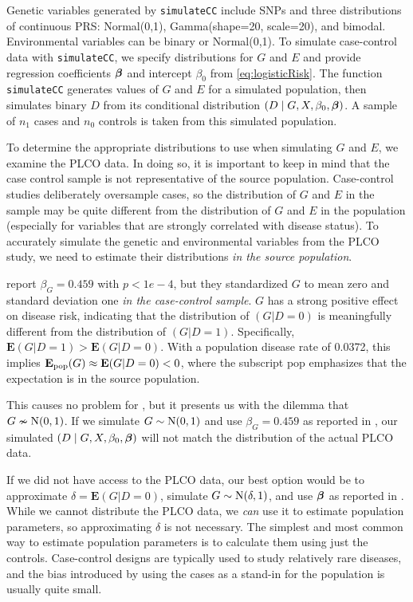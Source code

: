 \documentclass[]{article}
\begin{document}
Genetic variables generated by \texttt{simulateCC} include SNPs and
three distributions of continuous PRS: Normal(0,1), Gamma(shape=20,
scale=20), and bimodal. Environmental variables can be binary or
Normal(0,1). To simulate case-control data with \texttt{simulateCC}, we
specify distributions for \(G\) and \(E\) and provide regression
coefficients \(\mbox{\boldmath $\beta$}\) and intercept \(\beta_0\) from
\cref{eq:logisticRisk}. The function \texttt{simulateCC} generates
values of \(G\) and \(E\) for a simulated population, then simulates
binary \(D\) from its conditional distribution
\((D \mid G, X, \beta_0, \mbox{\boldmath $\beta$})\). A sample of \(n_1\) cases and
\(n_0\) controls is taken from this simulated population.

To determine the appropriate distributions to use when simulating \(G\)
and \(E\), we examine the PLCO data. In doing so, it is important to
keep in mind that the case control sample is not representative of the
source population. Case-control studies deliberately oversample cases,
so the distribution of \(G\) and \(E\) in the sample may be quite
different from the distribution of \(G\) and \(E\) in the population
(especially for variables that are strongly correlated with disease
status). To accurately simulate the genetic and environmental variables
from the PLCO study, we need to estimate their distributions
\emph{in the source population}.

\citeauthor{Wang2018unpublished} report \(\beta_G = 0.459\) with
\(p < 1e-4\), but they standardized \(G\) to mean zero and standard
deviation one \emph{in the case-control sample}. \(G\) has a strong
positive effect on disease risk, indicating that the distribution of
\((G|D=0)\) is meaningfully different from the distribution of
\((G|D=1)\). Specifically, \(\mathbf{E}(G|D=1) > \mathbf{E}(G|D=0)\).
With a population disease rate of 0.0372, this implies
\(\mathbf{E_{\rm pop}}(G) \approx \mathbf{E}(G|D=0) < 0\), where the
subscript pop emphasizes that the expectation is in the source
population.

This causes no problem for \citeauthor{Wang2018unpublished}, but it
presents us with the dilemma that \(G \nsim \hbox{N}(0,1)\). If we
simulate \(G \sim \hbox{N}(0,1)\) and use \(\beta_G = 0.459\) as
reported in \citeauthor{Wang2018unpublished}, our simulated
\((D \mid G, X, \beta_0, \mbox{\boldmath $\beta$})\) will not match the distribution of
the actual PLCO data.

If we did not have access to the PLCO data, our best option would be to
approximate \(\delta = \mathbf{E}(G|D=0)\), simulate
\(G \sim \hbox{N}(\delta, 1)\), and use \(\mbox{\boldmath $\beta$}\) as reported in
\citeauthor{Wang2018unpublished}. While we cannot distribute the PLCO
data, we \emph{can} use it to estimate population parameters, so
approximating \(\delta\) is not necessary. The simplest and most common
way to estimate population parameters is to calculate them using just
the controls. Case-control designs are typically used to study
relatively rare diseases, and the bias introduced by using the cases as
a stand-in for the population is usually quite small.
\end{document}
